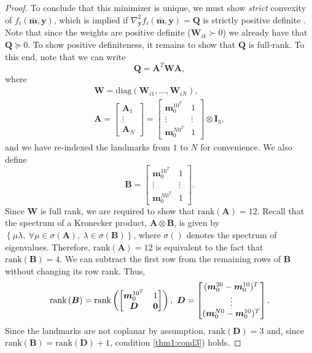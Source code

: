 \documentclass[lettersize,journal]{IEEEtran}
\newcommand{\rank}[1]{\mbox{rank}\left(#1\right)}
\newcommand{\diag}[1]{\mbox{diag}\left(#1\right)}
\begin{document}
\begin{proof}
To conclude that this minimizer is unique, we must show \emph{strict} convexity of $f_i(\bar{\bm{m}},\bm{y})$, which is implied if $\nabla_{\bm{y}}^2 f_i(\bar{\bm{m}},\bm{y}) = \bm{Q} $ is strictly positive definite \cite{boydConvexOptimization2004}. Note that since the weights are positive definite ($\bm{W}_{ik}\succ 0 $) we already have that $\bm{Q} \succeq 0$. To show positive definiteness, it remains to show that $\bm{Q}$ is full-rank. To this end, note that we can write
\begin{equation}
	\bm{Q} = \bm{A}^T \bm{W} \bm{A},
\end{equation}
where
\begin{gather}
	\bm{W} = \diag{\bm{W}_{i1},\ldots,\bm{W}_{iN}},\\
	\bm{A} = \begin{bmatrix}
		 \bm{A}_1 \\ \vdots \\ \bm{A}_N
	\end{bmatrix} = \begin{bmatrix}
		 \bm{m}_0^{10^T} & 1 \\
		 \vdots& \vdots\\
		 \bm{m}_0^{N0^T} & 1
	\end{bmatrix}\otimes \bm{I}_3,
\end{gather}
and we have re-indexed the landmarks from $1$ to $N$ for convenience. We also define
\begin{equation*}
	\bm{B} = \begin{bmatrix}
		\bm{m}_0^{10^T} & 1 \\
		\vdots&\vdots\\
		\bm{m}_0^{N0^T} & 1
	\end{bmatrix}.
\end{equation*}
Since $\bm{W}$ is full rank, we are required to show that $\rank{\bm{A}} = 12$. 
Recall that the spectrum of a Kronecker product, $\bm{A}\otimes\bm{B}$, is given by $\left\{ \mu\lambda,~ \forall \mu \in \sigma(\bm{A}),~ \lambda \in \sigma(\bm{B})\right\}$, where $\sigma()$ denotes the spectrum of eigenvalues.
Therefore, $\rank{\bm{A}} = 12$ is equivalent to the fact that $\rank{\bm{B}}=4$. We can subtract the first row from the remaining rows of $\bm{B}$ without changing its row rank. Thus,
\begin{equation*}
	\rank{\bm{B}} = \rank{\begin{bmatrix}
			\bm{m}_0^{10^T} & 1 \\
			\bm{D} & \bm{0}
		\end{bmatrix}}, ~ \bm{D} = \begin{bmatrix}
		(\bm{m}_0^{20}-\bm{m}_0^{10})^T  \\
		\vdots\\
		(\bm{m}_0^{N0}-\bm{m}_0^{10})^T 
	\end{bmatrix}.\\	
\end{equation*}
Since the landmarks are not coplanar by assumption, $\rank{\bm{D}}=3$ and, since $\rank{\bm{B}} = \rank{\bm{D}} + 1$, condition \ref{thm1:cond3}) holds.
 

\end{proof}
\end{document}
